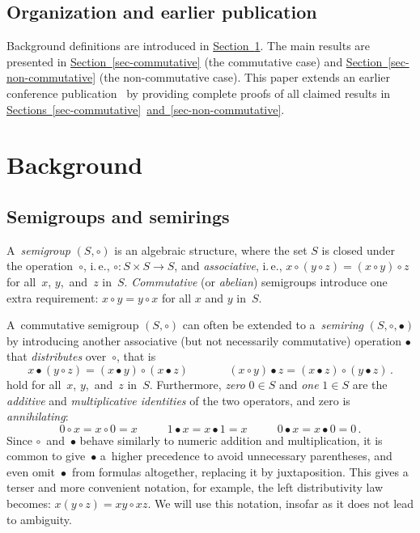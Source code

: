 \documentclass[11pt]{article}
\numberwithin{equation}{section}
\theoremstyle{definition}
\theoremstyle{plain}
\newcommand{\ie}{i.\,e.}
\newcommand{\expref}[2]{\hyperref[#2]{#1~\ref{#2}}}
\theoremstyle{plain}\newtheorem{observation}[theorem]{Observation}
\begin{document}
%

\subsection{Organization and earlier publication}

Background definitions are introduced in \expref{Section}{sec:background}. The main
results are presented in \expref{Section}{sec-commutative} (the commutative case)
and \expref{Section}{sec-non-commutative} (the non-commutative case).
This paper extends an earlier conference publication~\cite{conf-version}
by providing complete proofs of all claimed results in
\expref{Sections}{sec-commutative}~\expref{and}{sec-non-commutative}.

\section{Background} \label{sec:background}

\subsection{Semigroups and semirings}
%
A~\emph{semigroup} $(S, \circ)$ is an algebraic structure, where
%
the set $S$ is closed under the operation~$\circ$,
\ie, $\circ : S\times S \rightarrow S$,
and
\emph{associative}, \ie,
$x \circ (y \circ z) = (x \circ y) \circ z$ for all~$x$, $y$,~and~$z$
in~$S$.
\emph{Commutative} (or \emph{abelian}) semigroups introduce
one extra requirement: $x \circ y = y \circ x$ for all $x$ and $y$
in~$S$.

A~commutative semigroup $(S, \circ)$ can often be extended to
a~\emph{semiring} $(S, \circ, \bullet)$ by introducing
another associative (but not necessarily commutative)
operation $\bullet$ that \emph{distributes} over~$\circ$, that is
\[
x \bullet (y \circ z) = (x \bullet y) \circ (x \bullet z)~~~~~~~~~~~~~~~~(x \circ y) \bullet z = (x \bullet z) \circ (y \bullet z)\,.
\]
hold for all~$x$, $y$,~and~$z$ in~$S$.
Furthermore, \emph{zero} $0 \in S$ and \emph{one} $1 \in S$ are the
\emph{additive} and \emph{multiplicative identities} of the two operators,
and zero is \emph{annihilating}:
\[
0 \circ x = x \circ 0=x~~~~~~~~~~~~1 \bullet x = x \bullet 1 = x~~~~~~~~~~~~0 \bullet x = x \bullet 0 = 0\,.
\]
Since $\circ$~and~$\bullet$ behave
similarly to numeric addition and multiplication, it is common to
give~$\bullet$ a~higher precedence to avoid
unnecessary parentheses, and even omit~$\bullet$~from
formulas altogether, replacing it by juxtaposition.
This gives a terser and more convenient notation, for example, the left
distributivity law becomes: $x (y \circ z) = x y \circ x z$. We will use this
notation, insofar as it does not lead to ambiguity.
\end{document}
